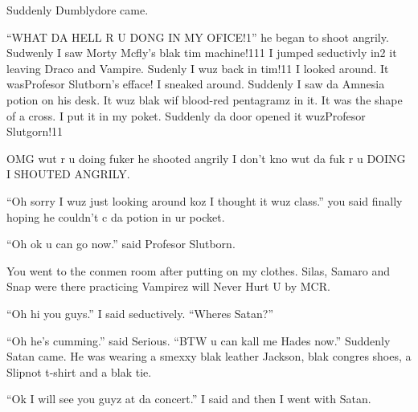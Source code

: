 Suddenly Dumblydore came.

\enquote{WHAT DA HELL R U DONG IN MY OFICE!1} he began to shoot angrily. Sudwenly I saw Morty Mcfly's blak tim machine!111 I jumped seductivly in2 it leaving Draco and Vampire. Sudenly I wuz back in tim!11 I looked around. It was\dotfill\newline Profesor Slutborn's efface! I sneaked around. Suddenly I saw da Amnesia potion on his desk. It wuz blak wif blood-red pentagramz in it. It was the shape of a cross. I put it in my poket. Suddenly da door opened it wuz\dotfill Profesor Slutgorn!11

OMG wut r u doing fuker he shooted angrily I don't kno wut da fuk r u DOING I SHOUTED ANGRILY\@.

\enquote{Oh sorry I wuz just looking around koz I thought it wuz class.} you said finally hoping he couldn't c da potion in ur pocket.

\enquote{Oh ok u can go now.} said Profesor Slutborn.

You went to the conmen room after putting on my clothes. Silas, Samaro and Snap were there practicing Vampirez will Never Hurt U by MCR\@.

\enquote{Oh hi you guys.} I said seductively. \enquote{Wheres Satan?}

\enquote{Oh he's cumming.} said Serious. \enquote{BTW u can kall me Hades now.} Suddenly Satan came. He was wearing a smexxy blak leather Jackson, blak congres shoes, a Slipnot t-shirt and a blak tie.

\enquote{Ok I will see you guyz at da concert.} I said and then I went with Satan.

